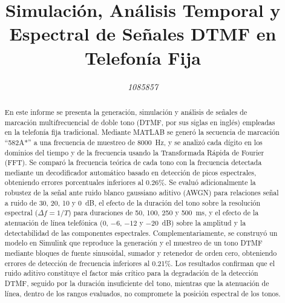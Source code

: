 \documentclass[conference]{IEEEtran}
\begin{document}
\title{Simulación, Análisis Temporal y Espectral de Señales DTMF en Telefonía Fija}

\author{
    \textit{1085857}
}

\maketitle

\begin{abstract}
En este informe se presenta la generación, simulación y análisis de señales de marcación multifrecuencial de doble tono (DTMF, por sus siglas en inglés) empleadas en la telefonía fija tradicional. Mediante MATLAB se generó la secuencia de marcación ``582A*'' a una frecuencia de muestreo de 8000~Hz, y se analizó cada dígito en los dominios del tiempo y de la frecuencia usando la Transformada Rápida de Fourier (FFT). Se comparó la frecuencia teórica de cada tono con la frecuencia detectada mediante un decodificador automático basado en detección de picos espectrales, obteniendo errores porcentuales inferiores al 0.26\%. Se evaluó adicionalmente la robustez de la señal ante ruido blanco gaussiano aditivo (AWGN) para relaciones señal a ruido de 30, 20, 10 y 0~dB, el efecto de la duración del tono sobre la resolución espectral ($\Delta f = 1/T$) para duraciones de 50, 100, 250 y 500~ms, y el efecto de la atenuación de línea telefónica (0, $-6$, $-12$ y $-20$~dB) sobre la amplitud y la detectabilidad de las componentes espectrales. Complementariamente, se construyó un modelo en Simulink que reproduce la generación y el muestreo de un tono DTMF mediante bloques de fuente sinusoidal, sumador y retenedor de orden cero, obteniendo errores de detección de frecuencia inferiores al 0.21\%. Los resultados confirman que el ruido aditivo constituye el factor más crítico para la degradación de la detección DTMF, seguido por la duración insuficiente del tono, mientras que la atenuación de línea, dentro de los rangos evaluados, no compromete la posición espectral de los tonos.
\end{abstract}
\end{document}
